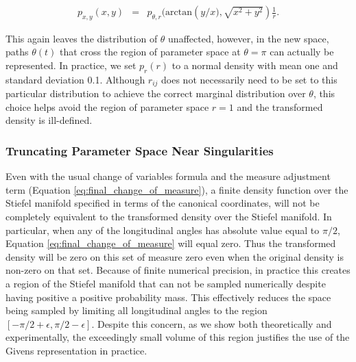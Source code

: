\documentclass[ba]{imsart}
\numberwithin{equation}{section}
\theoremstyle{plain}
\begin{document}
\begin{eqnarray}
p_{x, y}(x,y) &=& p_{\theta, r}(\mathrm{arctan} \left(y/x), \sqrt{x^2 + y^2} \right) \frac{1}{r}.
\end{eqnarray}

\noindent This again leaves the distribution of $\theta$ unaffected, however, in the new space, paths $\theta(t)$ that cross the region of parameter space at $\theta = \pi$ can actually be represented. In practice, we set  $p_r(r)$ to a normal density with mean one and standard deviation 0.1. Although $r_{ij}$ does not necessarily need to be set to this particular distribution to achieve the correct marginal distribution over $\theta$, this choice helps avoid the region of parameter space $r = 1$ and the transformed density is ill-defined.

\subsubsection{Truncating Parameter Space Near Singularities}
\noindent  Even with the usual change of variables formula and the measure adjustment term (Equation \ref{eq:final_change_of_measure}), a finite density function over the Stiefel manifold specified in terms of the canonical coordinates, will not be completely equivalent to the transformed density over the Stiefel manifold. In particular, when any of the longitudinal angles has absolute value equal to $\pi/2$, Equation \ref{eq:final_change_of_measure} will equal zero. Thus the transformed density will be zero on this set of measure zero even when the original density is non-zero on that set. Because of finite numerical precision, in practice this creates a region of the Stiefel manifold that can not be sampled numerically despite having positive a positive probability mass. This effectively reduces the space being sampled by limiting all longitudinal angles to the region $[-\pi/2 + \epsilon, \pi/2 - \epsilon]$. Despite this concern, as we show both theoretically and experimentally, the exceedingly small volume of this region justifies the use of the Givens representation in practice.



\end{document}
